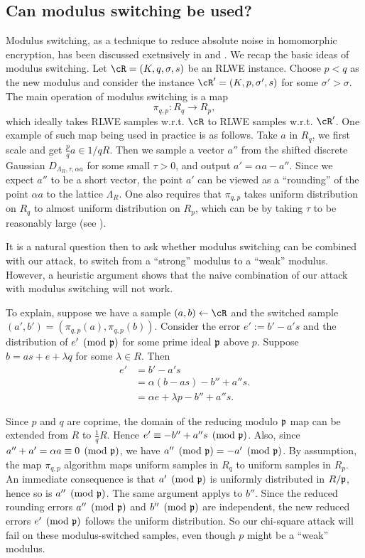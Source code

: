 \documentclass{amsart}
\begin{document}
\subsection{Can modulus switching be used?}
Modulus switching, as a technique to reduce absolute noise
in homomorphic encryption, has been discussed exetnsively in  \cite{brakerski2012leveled} and \cite{langlois2014worst}.
We recap the basic ideas of modulus switching. Let $\cR = (K, q, \sigma, s)$ be an RLWE instance. Choose $p < q$ as the new modulus and consider the instance $\cR' = (K,p,\sigma',s)$ for some $\sigma' > \sigma$. The main operation of modulus switching is a map
\[
\pi_{q,p} : R_q \to R_p,
\]
which ideally takes RLWE samples w.r.t. $\cR$ to RLWE samples w.r.t. $\cR'$. One example of such map being used in practice is as follows. Take $a$ in $R_q$, we first scale and get $\frac{p}{q}a \in 1/q R$. Then we sample a vector $a''$ from the shifted discrete Gaussian $D_{\Lambda_R, \tau, \alpha a}$ for some small $\tau > 0$, and output $a' = \alpha a - a''$. Since we expect $a''$ to be a  short vector, the point $a'$ can be viewed as a ``rounding'' of the point $\alpha a$ to the lattice $\Lambda_R$. One also requires that $\pi_{q,p}$ takes uniform distribution on $R_q$ to almost uniform distribution on $R_p$, which can be by taking $\tau$ to be reasonably large (see ).


It is a natural question then to ask whether modulus switching can be combined with our attack, to switch from a ``strong'' modulus to a ``weak'' modulus. However, a heuristic argument shows that the naive combination of our attack with modulus switching will not work.

To explain, suppose we have a sample $(a,b) \gets \cR$ and the switched sample $(a', b') = (\pi_{q,p}(a),\pi_{q,p}(b))$. Consider the error $e':= b' - a's$ and the distribution of $e' \pmod{\mathfrak{p}}$ for some prime ideal $\mathfrak{p}$ above $p$. Suppose $b = as+e+ \lambda q$ for some $\lambda \in R$. Then
\begin{align*}
    e' &= b' - a's  \\
    &= \alpha(b-as) - b''  + a''s. \\
    & = \alpha e + \lambda p - b'' + a''s.
\end{align*}

Since $p$ and $q$ are coprime, the domain of the reducing modulo $\mathfrak{p}$ map can be extended from $R$ to $\frac{1}{q}R$. Hence $e' \equiv - b'' + a'' s \pmod{\mathfrak{p}}$. Also, since $a'' + a' = \alpha a \equiv 0 \pmod {\mathfrak{p}}$, we have $a'' \pmod{\mathfrak{p}} = -a' \pmod{\mathfrak{p}}$. By assumption, the map $\pi_{q,p}$ algorithm maps uniform samples in $R_q$ to uniform samples in $R_p$. An immediate consequence is that $a' \pmod{\mathfrak{p}}$ is uniformly distributed in $R/\mathfrak{p}$, hence so is $a'' \pmod{\mathfrak{p}}$. The same argument applys to $b''$. Since the reduced rounding errors $a'' \pmod{\mathfrak{p}}$ and $b'' \pmod{\mathfrak{p}}$ are independent, the new reduced errors $e' \pmod{\mathfrak{p}}$ follows the uniform distribution. So our chi-square attack will fail on these modulus-switched samples, even though $p$ might be a ``weak'' modulus.
\end{document}
